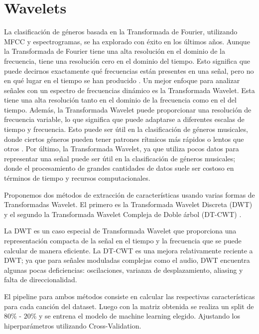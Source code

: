 \documentclass[colorinlistoftodos,twoside,twocolumn,10pt]{article} %
\begin{document}
	\section{Wavelets}

La clasificaci\'on de g\'eneros basada en la Transformada de Fourier, utilizando MFCC y espectrogramas, se ha explorado con \'exito en los \'ultimos a\~nos. Aunque la Transformada de Fourier tiene una alta resoluci\'on en el dominio de la frecuencia, tiene una resoluci\'on cero en el dominio del tiempo. Esto significa que puede decirnos exactamente qu\'e frecuencias est\'an presentes en una se\~nal, pero no en qu\'e lugar en el tiempo se han producido \cite{wavelet transform in machine learning}. Un mejor enfoque para analizar se\~nales con un espectro de frecuencias din\'amico es la Transformada Wavelet. Esta tiene una alta resoluci\'on tanto en el dominio de la frecuencia como en el del tiempo. Adem\'as, la Transformada Wavelet puede proporcionar una resoluci\'on de frecuencia variable, lo que significa que puede adaptarse a diferentes escalas de tiempo y frecuencia. Esto puede ser \'util en la clasificaci\'on de g\'eneros musicales, donde ciertos g\'eneros pueden tener patrones r\'itmicos m\'as r\'apidos o lentos que otros \cite{Musical Genre Classification Of Audio Signals}. Por \'ultimo, la Transformada Wavelet, ya que utiliza pocos datos para representar una se\~nal puede ser \'util en la clasificaci\'on de g\'eneros musicales; donde el procesamiento de grandes cantidades de datos suele ser costoso en t\'erminos de tiempo y recursos computacionales. 

	Proponemos dos m\'etodos de extracci\'on de caracter\'isticas usando varias formas de Transformadas Wavelet. 
    El primero es la Transformada Wavelet Discreta (DWT) \cite{wavelet transform in machine learning} y el segundo la Transformada Wavelet Compleja de Doble \'arbol (DT-CWT) \cite{DT-CWT}.
    
    La DWT es un caso especial de Transformada Wavelet que proporciona una representaci\'on compacta de la se\~nal en el tiempo y la frecuencia que se puede calcular de manera eficiente\cite{Musical Genre Classification Of Audio Signals}. La DT-CWT es una mejora relativamente reciente a DWT; ya que para se\~nales moduladas complejas como el audio, DWT encuentra algunas pocas deficiencias: oscilaciones, varianza de desplazamiento, aliasing y falta de direccionalidad\cite{Wavelet Transform for Music Genre Classification}. 
    
    El pipeline para ambos m\'etodos consiste en calcular las respectivas caracter\'isticas para cada canci\'on del dataset. Luego con la matriz obtenida se realiza un split de $80\%$ - $20\%$ y se entrena el modelo de machine learning elegido. Ajustando los hiperpar\'ametros utilizando Cross-Validation.
\end{document}
